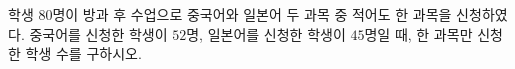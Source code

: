 학생 $80$명이 방과 후 수업으로 중국어와 일본어 두 과목 중 적어도 한 과목을 신청하였다. 중국어를 신청한 학생이 $52$명, 일본어를 신청한 학생이 $45$명일 때, 한 과목만 신청한 학생 수를 구하시오.
